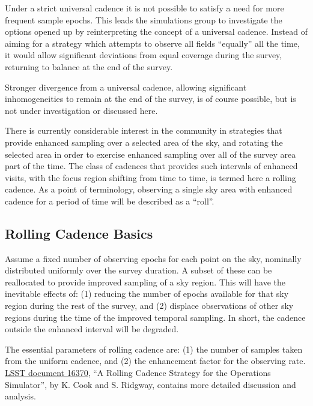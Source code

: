 Under a strict universal cadence it is not possible to satisfy a need
for more frequent sample epochs.  This leads the simulations group to
investigate the options opened up by reinterpreting the concept of a
universal cadence.  Instead of aiming for a strategy which attempts to
observe all fields ``equally'' all the time, it would allow significant
deviations from equal coverage during the survey, returning to balance
at the end of the survey.

Stronger divergence from a universal cadence, allowing significant
inhomogeneities to remain at the end of the survey, is of course
possible, but is not under investigation or discussed here.

There is currently considerable interest in the community in strategies
that provide enhanced sampling over a selected area of the sky, and
rotating the selected area in order to exercise enhanced sampling over
all of the survey area part of the time.  The class of cadences that
provides such intervals of enhanced visits, with the focus region
shifting from time to time, is termed here a rolling cadence.  As a
point of terminology, observing a single sky area with enhanced cadence
for a period of time will be described as a ``roll''.


\subsection{Rolling Cadence Basics}

Assume a fixed number of observing epochs for each point on the sky,
nominally distributed uniformly over the survey duration.  A subset of
these can be reallocated to provide improved sampling of a sky region.
This will have the inevitable effects of: (1) reducing the number of
epochs available for that sky region during the rest of the survey, and
(2) displace observations of other sky regions during the time of the
improved temporal sampling.  In short, the cadence outside the enhanced
interval will be degraded.

The essential parameters of rolling cadence are: (1) the number of
samples taken from the uniform cadence, and (2) the enhancement factor
for the observing rate.
\href{https://project.lsst.org/meetings/ocw/sites/lsst.org.meetings.ocw/files/OpSim%20Rolling%20Cadence%20Stratgey-ver1.3.pdf}{LSST document 16370},
``A Rolling Cadence Strategy for the Operations Simulator'', by K. Cook
and S. Ridgway, contains more detailed discussion and analysis.

